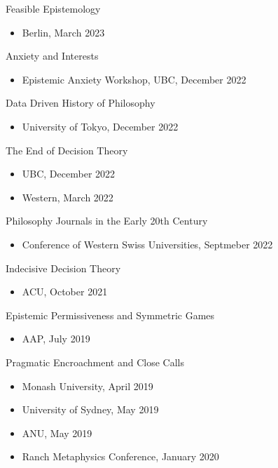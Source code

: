 \documentclass[
  10pt,
  letterpaper,
  DIV=11,
  numbers=noendperiod,
  twoside]{scrartcl}
\providecommand{\tightlist}{%
  \setlength{\itemsep}{0pt}\setlength{\parskip}{0pt}}\usepackage{longtable,booktabs,array}
\begin{document}
Feasible Epistemology

\begin{itemize}
\tightlist
\item
  Berlin, March 2023
\end{itemize}

Anxiety and Interests

\begin{itemize}
\tightlist
\item
  Epistemic Anxiety Workshop, UBC, December 2022
\end{itemize}

Data Driven History of Philosophy

\begin{itemize}
\tightlist
\item
  University of Tokyo, December 2022
\end{itemize}

The End of Decision Theory

\begin{itemize}
\tightlist
\item
  UBC, December 2022
\item
  Western, March 2022
\end{itemize}

Philosophy Journals in the Early 20th Century

\begin{itemize}
\tightlist
\item
  Conference of Western Swiss Universities, Septmeber 2022
\end{itemize}

Indecisive Decision Theory

\begin{itemize}
\tightlist
\item
  ACU, October 2021
\end{itemize}

Epistemic Permissiveness and Symmetric Games

\begin{itemize}
\tightlist
\item
  AAP, July 2019
\end{itemize}

Pragmatic Encroachment and Close Calls

\begin{itemize}
\tightlist
\item
  Monash University, April 2019
\item
  University of Sydney, May 2019
\item
  ANU, May 2019
\item
  Ranch Metaphysics Conference, January 2020
\end{itemize}
\end{document}
